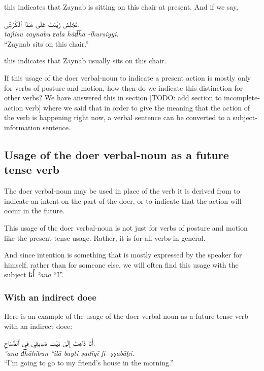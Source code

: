 \documentclass[
  10pt,
]{book}
\begin{document}
this indicates that Zaynab is sitting on this chair at present. And if we say,

\foreignlanguage{arabic}{تَجْلِسُ زَيْنَبُ عَلَى هَـٰذَا ٱلْکُرْسِيِّ.}\\
\emph{tajlisu zaynabu ɛala hād͡ha -lkursiyyi.}\\
\enquote{Zaynab sits on this chair.}

this indicates that Zaynab usually sits on this chair.

If this usage of the doer verbal-noun to indicate a present action is mostly only for verbs of posture and motion, how then do we indicate this distinction for other verbs? We have answered this in section {[}TODO: add section to incomplete-action verb{]} where we said that in order to give the meaning that the action of the verb is happening right now, a verbal sentence can be converted to a subject-information sentence.

\subsection{Usage of the doer verbal-noun as a future tense verb}\label{doer-verbal-noun-for-intended-future-action}

The doer verbal-noun may be used in place of the verb it is derived from to indicate an intent on the part of the doer, or to indicate that the action will occur in the future.

This usage of the doer verbal-noun is not just for verbs of posture and motion like the present tense usage. Rather, it is for all verbs in general.

And since intention is something that is mostly expressed by the speaker for himself, rather than for someone else, we will often find this usage with the subject \foreignlanguage{arabic}{أَنَا} \emph{ʾana} \enquote{I}.

\subsubsection{With an indirect doee}\label{with-an-indirect-doee-1}

Here is an example of the usage of the doer verbal-noun as a future tense verb with an indirect doee:

\foreignlanguage{arabic}{أَنَا ذَاهِبٌ إِلَىٰ بَيْتِ صَدِيقِي فِي ٱلصَّبَاحِ.}\\
\emph{ʾana d͡hāhibun ʾilā bayti ṣadīqī fi -ṣṣabāḥi.}\\
\enquote{I'm going to go to my friend's house in the morning.}
\end{document}
